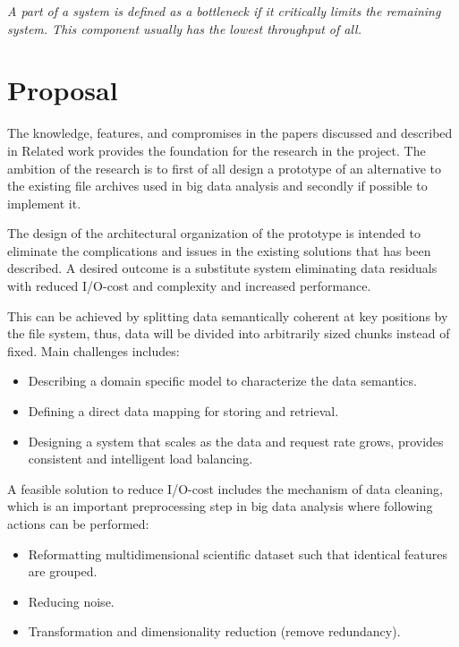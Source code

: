 \begin{definition} \label{def:bottle}
\textit{A part of a system is defined as a bottleneck if it critically limits the remaining system. This component usually has the lowest throughput of all.}
\end{definition}

\section{Proposal} \label{sec:proposal}
The knowledge, features, and compromises in the papers discussed and described in Related work provides the foundation for the research in the project. The ambition of the research is to first of all design a prototype of an alternative to the existing file archives used in big data analysis and secondly if possible to implement it.
\newline

The design of the architectural organization of the prototype is intended to eliminate the complications and issues in the existing solutions that has been described. A desired outcome is a substitute system eliminating data residuals with reduced I/O-cost and complexity and increased performance.
\newline

This can be achieved by splitting data semantically coherent at key positions by the file system, thus, data will be divided into arbitrarily sized chunks instead of fixed. Main challenges includes:
\vspace*{2mm}
\begin{itemize}
	\item Describing a domain specific model to characterize the data semantics.
	\item Defining a direct data mapping for storing and retrieval.
	\item Designing a system that scales as the data and request rate grows, \ie provides consistent and intelligent load balancing.
\end{itemize}

A feasible solution to reduce I/O-cost includes the mechanism of data cleaning, which is an important preprocessing step in big data analysis where \ie following actions can be performed:
\begin{itemize}
	\item Reformatting multidimensional scientific dataset such that identical features are grouped.
	\item Reducing noise.
	\item Transformation and dimensionality reduction (remove redundancy).
\end{itemize}
\vspace*{5mm}

